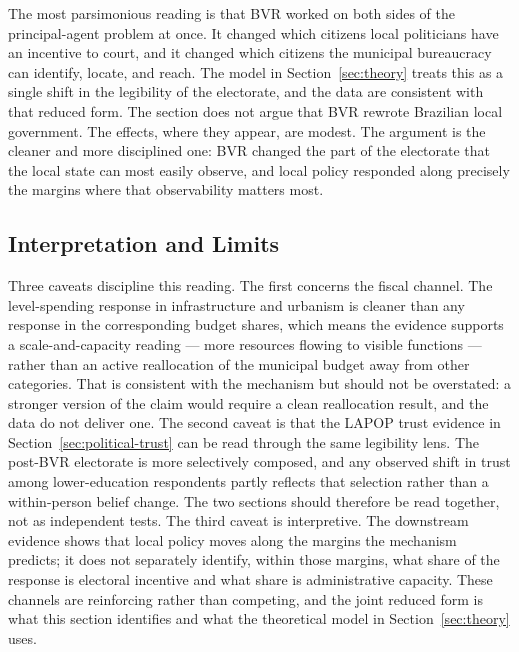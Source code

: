 The most parsimonious reading is that BVR worked on both sides of the principal-agent problem at once. It changed which citizens local politicians have an incentive to court, and it changed which citizens the municipal bureaucracy can identify, locate, and reach. The model in Section~\ref{sec:theory} treats this as a single shift in the legibility of the electorate, and the data are consistent with that reduced form. The section does not argue that BVR rewrote Brazilian local government. The effects, where they appear, are modest. The argument is the cleaner and more disciplined one: BVR changed the part of the electorate that the local state can most easily observe, and local policy responded along precisely the margins where that observability matters most.

\subsection{Interpretation and Limits}
\label{ssec:downstream-limits}

Three caveats discipline this reading. The first concerns the fiscal channel. The level-spending response in infrastructure and urbanism is cleaner than any response in the corresponding budget shares, which means the evidence supports a scale-and-capacity reading --- more resources flowing to visible functions --- rather than an active reallocation of the municipal budget away from other categories. That is consistent with the mechanism but should not be overstated: a stronger version of the claim would require a clean reallocation result, and the data do not deliver one. The second caveat is that the LAPOP trust evidence in Section~\ref{sec:political-trust} can be read through the same legibility lens. The post-BVR electorate is more selectively composed, and any observed shift in trust among lower-education respondents partly reflects that selection rather than a within-person belief change. The two sections should therefore be read together, not as independent tests. The third caveat is interpretive. The downstream evidence shows that local policy moves along the margins the mechanism predicts; it does not separately identify, within those margins, what share of the response is electoral incentive and what share is administrative capacity. These channels are reinforcing rather than competing, and the joint reduced form is what this section identifies and what the theoretical model in Section~\ref{sec:theory} uses.
